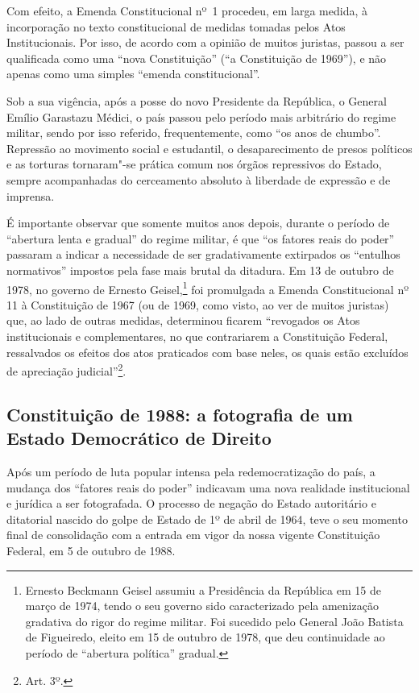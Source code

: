 Com efeito, a Emenda Constitucional nº~1 procedeu, em larga medida, à
incorporação no texto constitucional de medidas tomadas pelos Atos
Institucionais. Por isso, de acordo com a opinião de muitos juristas,
passou a ser qualificada como uma ``nova Constituição'' (``a
Constituição de 1969''), e não apenas como uma simples ``emenda
constitucional''.

Sob a sua vigência, após a posse do novo Presidente da República, o
General Emílio Garastazu Médici, o país passou pelo período mais
arbitrário do regime militar, sendo por isso referido, frequentemente,
como ``os anos de chumbo''. Repressão ao movimento social e
estudantil, o desaparecimento de presos políticos e as torturas
tornaram"-se prática comum nos órgãos repressivos do Estado, sempre
acompanhadas do cerceamento absoluto à liberdade de expressão e de
imprensa.

É importante observar que somente muitos anos depois, durante o período
de ``abertura lenta e gradual'' do regime militar, é que ``os
fatores reais do poder'' passaram a indicar a necessidade de ser
gradativamente extirpados os ``entulhos normativos'' impostos pela fase
mais brutal da ditadura. Em 13 de outubro de 1978, no governo de Ernesto
Geisel,\footnote{Ernesto Beckmann Geisel assumiu a Presidência da
  República em 15 de março de 1974, tendo o seu governo sido
  caracterizado pela amenização gradativa do rigor do regime militar.
  Foi sucedido pelo General João Batista de Figueiredo, eleito em 15 de
  outubro de 1978, que deu continuidade ao período de ``abertura
  política'' gradual.} foi promulgada a Emenda Constitucional nº 11 à
Constituição de 1967 (ou de 1969, como visto, ao ver de muitos juristas)
que, ao lado de outras medidas, determinou ficarem ``revogados os
Atos institucionais e complementares, no que contrariarem a Constituição
Federal, ressalvados os efeitos dos atos praticados com base neles, os
quais estão excluídos de apreciação judicial''\footnote{Art. 3º.}.

\subsection{Constituição de 1988: a fotografia de um Estado
Democrático de Direito}

Após um período de luta popular intensa pela redemocratização do país, a
mudança dos ``fatores reais do poder'' indicavam uma nova
realidade institucional e jurídica a ser fotografada. O processo de
negação do Estado autoritário e ditatorial nascido do golpe de Estado de
1º de abril de 1964, teve o seu momento final de consolidação com a
entrada em vigor da nossa vigente Constituição Federal, em 5 de outubro
de 1988.

